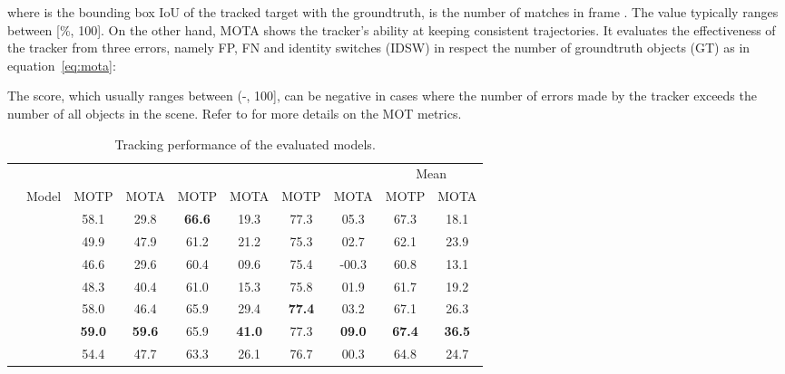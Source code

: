 \documentclass{svjour3}                     \smartqed
\newcommand{\vdir}[1]{\rotatebox[origin=c]{90}{#1}}
\newcommand{\bd}[1]{\textbf{#1}}
\begin{document}
where  is the bounding box IoU of the tracked target  with the groundtruth,  is the number of matches in frame . The value typically ranges between [\%, 100].
On the other hand, MOTA shows the tracker's ability at keeping consistent trajectories. It evaluates the effectiveness of the tracker from three errors, namely FP, FN and identity switches (IDSW) in respect the number of groundtruth objects (GT) as in equation~\ref{eq:mota}:

The score, which usually ranges between (-, 100], can be negative in cases where the number of errors made by the tracker exceeds the number of all objects in the scene. Refer to \cite{mot:bernardin2008evaluating} for more details on the MOT metrics.
\begin{table}[!htbp]
\caption{Tracking performance of the evaluated models.}
\setlength{\tabcolsep}{0.27em}
\begin{tabular}{c|l|cc|cc|cc||cc}
\rule{0pt}{3ex} \multirow{2}{*}{\makecell[l]{\vdir{}}}&
&\multicolumn{2}{c|}{} &\multicolumn{2}{c|}{} &\multicolumn{2}{c||}{}&\multicolumn{2}{c}{Mean}\\
& Model & {MOTP} & {MOTA} & {MOTP} & {MOTA} & {MOTP} & {MOTA} & {MOTP} & {MOTA} \\ \hline
\rule{0pt}{1ex} \multirow{4}{*}{\makecell[l]{\vdir{Baseline}}}
&               &58.1        &29.8        &\bd{66.6}    &19.3        &77.3      &05.3        &67.3        &18.1 \\
&         &49.9        &47.9        &61.2        &21.2        &75.3        &02.7        &62.1        &23.9 \\
&               &46.6        &29.6        &60.4        &09.6        &75.4        &-00.3        &60.8        &13.1 \\
&         &48.3        &40.4        &61.0        &15.3        &75.8        &01.9        &61.7        &19.2 \\ \hline
\rule{0pt}{1ex} \multirow{4}{*}{\makecell[l]{\vdir{Ours}}}
&             &58.0    	    &46.4        &65.9        &29.4    &\bd{77.4}        &03.2        &67.1       &26.3 \\
&             &\bd{59.0}       &\bd{59.6}    &65.9        &\bd{41.0}    &77.3       &\bd{09.0}    &\bd{67.4}  &\bd{36.5} \\
&              &54.4             &47.7        &63.3        &26.1        &76.7        &00.3        &64.8        &24.7 \\
\end{tabular}
\smallskip
\label{tab:tracking}
\end{table}
\end{document}
